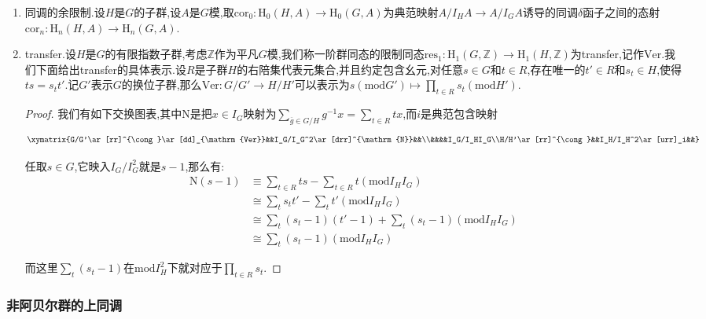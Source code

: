 \begin{enumerate}
\begin{proof}
		对于$n=0$,如果$a\in A^G$,那么$\mathrm{cor}\circ\mathrm{res}(a)=\sum_{\overline{g}\in G/H}ga=[G:H]a=na$.接下来由于$\mathrm{cor}\circ\mathrm{res}-n$是$\{\mathrm{H}^n(G,-)\}\to\{\mathrm{H}^n(G,-)\}$作为上同调$\delta$函子之间的态射,它必须是唯一的,但是它在零维情况是零映射,于是任意维上都是零映射,于是$\mathrm{cor}\circ\mathrm{res}=n$.
	\end{proof}
	\item 同调的余限制.设$H$是$G$的子群,设$A$是$G$模,取$\mathrm{cor}_0:\mathrm{H}_0(H,A)\to\mathrm{H}_0(G,A)$为典范映射$A/I_HA\to A/I_GA$诱导的同调$\delta$函子之间的态射$\mathrm{cor}_n:\mathrm{H}_n(H,A)\to\mathrm{H}_n(G,A)$.
	\item transfer.设$H$是$G$的有限指数子群,考虑$\mathbb{Z}$作为平凡$G$模,我们称一阶群同态的限制同态$\mathrm{res}_1:\mathrm{H}_1(G,\mathbb{Z})\to\mathrm{H}_1(H,\mathbb{Z})$为transfer,记作$\mathrm{Ver}$.我们下面给出transfer的具体表示.设$R$是子群$H$的右陪集代表元集合,并且约定包含幺元,对任意$s\in G$和$t\in R$,存在唯一的$t'\in R$和$s_t\in H$,使得$ts=s_tt'$.记$G'$表示$G$的换位子群,那么$\mathrm{Ver}:G/G'\to H/H'$可以表示为$s(\mathrm{mod}G')\mapsto\prod_{t\in R}s_t(\mathrm{mod}H')$.
	\begin{proof}
		
		我们有如下交换图表,其中$\mathrm{N}$是把$x\in I_G$映射为$\sum_{\overline{g}\in G/H}g^{-1}x=\sum_{t\in R}tx$,而$i$是典范包含映射
		$$\xymatrix{G/G'\ar[rr]^{\cong}\ar[dd]_{\mathrm{Ver}}&&I_G/I_G^2\ar[drr]^{\mathrm{N}}&&\\&&&&I_G/I_HI_G\\H/H'\ar[rr]^{\cong}&&I_H/I_H^2\ar[urr]_i&&}$$
		
		任取$s\in G$,它映入$I_G/I_G^2$就是$s-1$,那么有:
		\begin{align*}
			\mathrm{N}(s-1)&\equiv\sum_{t\in R}ts-\sum_{t\in R}t(\mathrm{mod}I_HI_G)\\&\cong\sum_ts_tt'-\sum_tt'(\mathrm{mod}I_HI_G)\\&\cong\sum_t(s_t-1)(t'-1)+\sum_t(s_t-1)(\mathrm{mod}I_HI_G)\\&\cong\sum_t(s_t-1)(\mathrm{mod}I_HI_G)
		\end{align*}
		
		而这里$\sum_t(s_t-1)$在$\mathrm{mod}I_H^2$下就对应于$\prod_{t\in R}s_t$.
	\end{proof}
\end{enumerate}
\subsubsection{非阿贝尔群的上同调}

